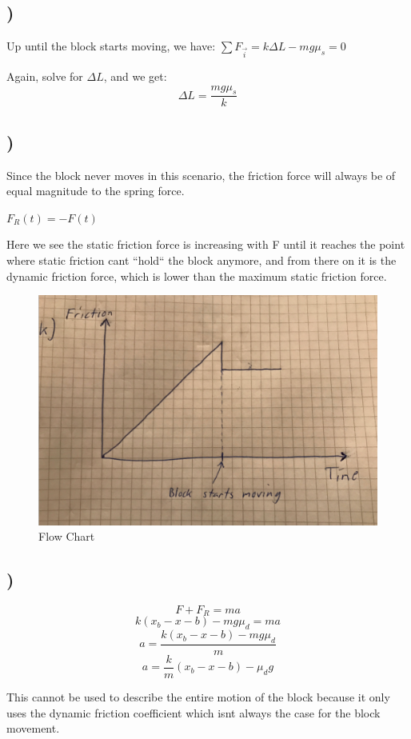 \documentclass[a4paper,10pt,norsk]{article}
\begin{document}
\subsection{)}
Up until the block starts moving, we have:
$\sum F_{\vec{i}} = k\Delta L - mg\mu_{s} = 0$

Again, solve for $\Delta L$, and we get:
\[\Delta L = \frac{mg\mu_{s}}{k}\]


\subsection{)}
Since the block never moves in this scenario, the friction force will always be of equal magnitude to the spring force.

$F_{R}(t) = -F(t)$

Here we see the static friction force is increasing with F until it reaches the point where static friction cant ``hold`` the block anymore, and from there on it is the dynamic friction force, which is lower than the maximum static friction force.
\begin{figure}[h!]
        \centering 
        \includegraphics[scale=0.5]{oppg_k.png} 
        \caption{Flow Chart}
\end{figure}


\subsection{)}
\[F + F_{R} = ma\]
\[k(x_{b} - x - b) - mg\mu_{d} = ma\]
\[a = \frac{k(x_{b} - x - b) - mg\mu_{d}}{m}\]
\[a = \frac{k}{m}(x_{b} - x - b) - \mu_{d}g\]

This cannot be used to describe the entire motion of the block because it only uses the dynamic friction coefficient which isnt always the case for the block movement.
\end{document}
